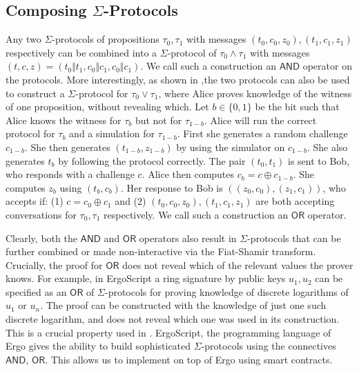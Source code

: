 \documentclass[11pt]{article}
\newcommand{\langname}{ErgoScript\xspace}
\newcommand{\andnode}{\ensuremath{\mathsf{AND}}}
\newcommand{\ornode}{\ensuremath{\mathsf{OR}}}
\begin{document}
\subsection{Composing $\Sigma$-Protocols}

Any two $\Sigma$-protocols of propositions $\tau_0, \tau_1$ with messages $(t_0, c_0, z_0), (t_1, c_1, z_1)$ respectively can be combined into a $\Sigma$-protocol of $\tau_0 \land \tau_1$ with messages $(t, c, z) = (t_0\Vert t_1,c_0\Vert c_1, c_0\Vert c_1)$. We call such a construction an $\andnode$ operator on the protocols. 
More interestingly, as shown in \cite{CDS94},the two protocols can also be used to construct a $\Sigma$-protocol for $\tau_0\lor \tau_1$, where Alice proves knowledge of the witness of one proposition, without revealing which. Let $b\in \{0, 1\}$ be the bit such that Alice knows the witness for $\tau_b$ but not for $\tau_{1-b}$. Alice will run the correct protocol for $\tau_b$ and a simulation for $\tau_{1-b}$. First she generates a random challenge $c_{1-b}$. She then generates $(t_{1-b}, z_{1-b})$ by using the simulator on $c_{1-b}$. She also generates $t_b$ by following the protocol correctly. The pair $(t_0, t_1)$ is sent to Bob, who responds with a challenge $c$. Alice then computes $c_b = c\oplus c_{1-b}$. She computes $z_b$ using $(t_b, c_b)$. Her response to Bob is $((z_0, c_0), (z_1, c_1))$, who accepts if: (1) $c = c_0 \oplus c_1$ and (2) $(t_0, c_0, z_0), (t_1, c_1, z_1)$ are both accepting conversations for $\tau_0, \tau_1$ respectively. We call such a construction an $\ornode$ operator. 

Clearly, both the $\andnode$ and $\ornode$ operators also result in $\Sigma$-protocols that can be further combined or made non-interactive via the Fiat-Shamir transform. Crucially, the proof for $\ornode$ does not reveal which of the relevant values the prover knows. For example, in \langname a ring signature by public keys $u_1, u_2$ can be specified as an $\ornode$ of $\Sigma$-protocols for proving knowledge of discrete logarithms of $u_1$ or $u_n$. The proof can be constructed with the knowledge of just one such discrete logarithm, and does not reveal which one was used in its construction. This is a crucial property used in \algname.
\langname, the programming language of Ergo gives the ability to build sophisticated $\Sigma$-protocols using the connectives $\andnode$, $\ornode$. This allows us to implement \algname on top of Ergo using smart contracts. 
\end{document}
